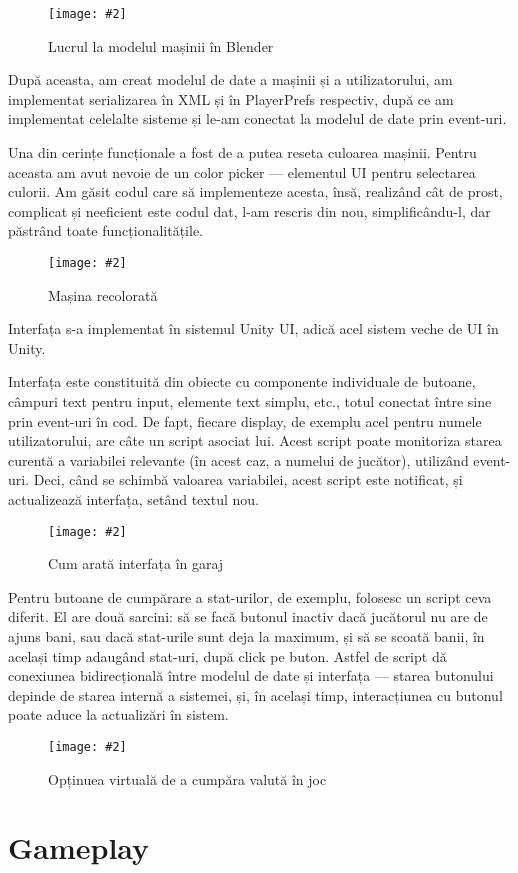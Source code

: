 \documentclass[a4paper,12pt]{report}
\newcommand{\centeredImageWithCaption}[2]{%
  \begin{figure}[H]
    \caption{#1}
    \texttt{[image: \#2]}
    \centering
  \end{figure}}
\begin{document}
\centeredImageWithCaption{Lucrul la modelul mașinii în Blender}{blender_car_model.png}

După aceasta, am creat modelul de date a mașinii și a utilizatorului, am implementat serializarea în \ac{XML} și în PlayerPrefs respectiv, după ce am implementat celelalte sisteme și le-am conectat la modelul de date prin event-uri.

Una din cerințe funcționale a fost de a putea reseta culoarea mașinii.
Pentru aceasta am avut nevoie de un color picker --- elementul \ac{UI} pentru selectarea culorii.
Am găsit codul care să implementeze acesta, însă, realizând cât de prost, complicat și neeficient este codul dat, l-am rescris din nou, simplificându-l, dar păstrând toate funcționalitățile.

\centeredImageWithCaption{Mașina recolorată}{car_different_color.png}


Interfața s-a implementat în sistemul Unity UI, adică acel sistem veche de UI în Unity.

Interfața este constituită din obiecte cu componente individuale de butoane, câmpuri text pentru input, elemente text simplu, etc., totul conectat între sine prin event-uri în cod.
De fapt, fiecare display, de exemplu acel pentru numele utilizatorului, are câte un script asociat lui.
Acest script poate monitoriza starea curentă a variabilei relevante (în acest caz, a numelui de jucător), utilizând event-uri.
Deci, când se schimbă valoarea variabilei, acest script este notificat, și actualizează interfața, setând textul nou.

\centeredImageWithCaption{Cum arată interfața în garaj}{garage.png}


Pentru butoane de cumpărare a stat-urilor, de exemplu, folosesc un script ceva diferit.
El are două sarcini: să se facă butonul inactiv dacă jucătorul nu are de ajuns bani, sau dacă stat-urile sunt deja la maximum, și să se scoată banii, în același timp adaugând stat-uri, după click pe buton.
Astfel de script dă conexiunea bidirecțională între modelul de date și interfața --- starea butonului depinde de starea internă a sistemei, și, în același timp, interacțiunea cu butonul poate aduce la actualizări în sistem.

\centeredImageWithCaption{Opținuea virtuală de a cumpăra valută în joc}{buy_coins.png}


\section{Gameplay}
\end{document}
